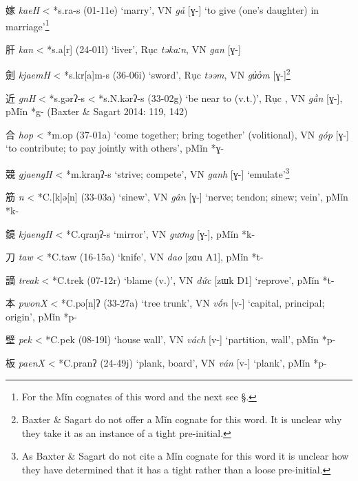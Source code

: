 \begin{description} \item
嫁 \emph{kaeH} \textless{} *s.{}ra-s (01-11e) `marry', VN \emph{gả}
{[}ɣ-] `to give (one's daughter) in marriage'\footnote{For the Mǐn
  cognates of this word and the next see §.}
\item
肝 \emph{kan} \textless{} *s.{}a{[}r] (24-01l) `liver', Rục
 \emph{təkaːn}, VN \emph{gan} {[}ɣ-]
\item
劍 \emph{kjaemH} \textless{} *s.kr{[}a]m-s (36-06i) `sword', Rục
 \emph{tə{}əm}, VN \emph{gu̓o̓m} {[}ɣ-]\footnote{Baxter \& Sagart do not
  offer a Mǐn cognate for this word. It is unclear why they take it as
  an instance of a tight pre-initial.}
\item
近 \emph{g{}nH} \textless{} *s.gərʔ-s \textless{} *s.N.kərʔ-s (33-02g)
`be near to (v.t.)', Rục \emph{}, VN \emph{gần} {[}ɣ-], pMǐn *g-
(Baxter \& Sagart 2014: 119, 142)
\item
合 \emph{hop} \textless{} *m.{}op (37-01a) `come together; bring
together' (volitional), VN \emph{góp} {[}ɣ-] `to contribute; to pay
jointly with others', pMǐn *ɣ-
\item
競 \emph{gjaengH} \textless{} *m.kraŋʔ-s `strive; compete', VN
 \emph{ganh} {[}ɣ-] `emulate'\footnote{As Baxter \& Sagart do not cite
  a Mǐn cognate for this word it is unclear how they have determined
  that it has a tight rather than a loose pre-initial.}
\item
筋 \emph{{}n} \textless{} *C.{[}k]ə[n] (33-03a) `sinew', VN
 \emph{gân} {[}ɣ-] `nerve; tendon; sinew; vein', pMǐn *k-
\item
鏡 \emph{kjaengH} \textless{} *C.qraŋʔ-s `mirror', VN \emph{gương}
{[}ɣ-], pMǐn *k-
\item
刀 \emph{taw} \textless{} *C.t{}aw (16-15a) `knife', VN \emph{dao} {[}zɑu
A1], pMǐn *t-
\item
謫 \emph{treak} \textless{} *C.t{}rek (07-12r) `blame (v.)', VN
 \emph{dức} {[}zɯk D1] `reprove', pMǐn *t-
\item
本 \emph{pwonX} \textless{} *C.p{}ə[n]ʔ (33-27a) `tree trunk', VN
 \emph{vốn} {[}v-] `capital, principal; origin', pMǐn *p-
\item
壁 \emph{pek} \textless{} *C.p{}ek (08-19l) `house wall', VN \emph{vách}
{[}v-] `partition, wall', pMǐn *p-
\item
板 \emph{paenX} \textless{} *C.p{}ranʔ (24-49j) `plank, board', VN
 \emph{ván} {[}v-] `plank', pMǐn *p-
\end{description}

